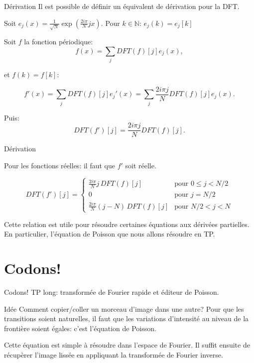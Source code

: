 \begin{frame}{Dérivation}
Il est possible de définir un équivalent de dérivation pour la DFT.

Soit $e_j(x) = \frac{1}{\sqrt{N}}\exp(\frac{2i\pi}{N}jx)$.
Pour $k \in \mathbb{N}$:  $e_j(k)=e_j[k]$ 

Soit $f$ la fonction périodique:
\[f(x) = \sum_j DFT(f)[j]e_j(x),\]

et $f(k) = f[k]$: 

\[f'(x) = \sum_j DFT(f)[j]e_j'(x)=\sum_j \frac{2i\pi j}{N}DFT(f)[j]e_j(x).\]

Puis: 
\[DFT(f')[j] = \frac{2i\pi j}{N}DFT(f)[j].\]
\end{frame}

\begin{frame}{Dérivation}

Pour les fonctions réelles: il faut que $f'$ soit réelle.

\[
DFT(f')[j] =
\begin{cases}
\frac{2i\pi}{N}j\,DFT(f)[j] & \text{pour }0\leq j<N/2\\
0 & \text{pour }j=N/2\\
\frac{2i\pi}{N}(j-N)\,DFT(f)[j] & \text{pour }N/2<j<N
\end{cases}
\]

Cette relation est utile pour résoudre certaines équations aux dérivées partielles. En particulier, l'équation de Poisson que nous allons résoudre en TP.

\end{frame}

\section{Codons!}
\begin{frame}{Codons!}
	TP long: transformée de Fourier rapide et éditeur de Poisson.
	
	\begin{block}{Idée}
	Comment copier/coller un morceau d'image dans une autre? Pour que les transitions soient naturelles, il faut que les variations d'intensité au niveau de la frontière soient égales: c'est l'équation de Poisson.
	
	Cette équation est simple à résoudre dans l'espace de Fourier. Il suffit ensuite de récupèrer l'image lissée en appliquant la transformée de Fourier inverse.
	\end{block}
\end{frame}

